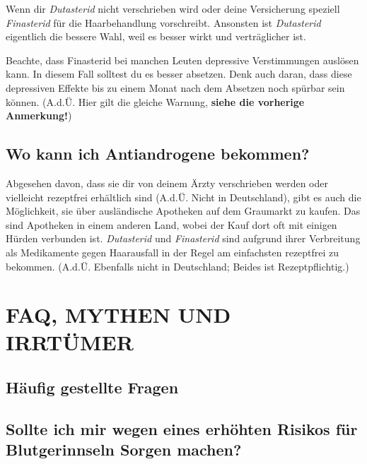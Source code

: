 \documentclass{article}
\begin{document}
Wenn dir \textit{Dutasterid} nicht verschrieben wird oder deine Versicherung speziell \textit{Finasterid} für die Haarbehandlung vorschreibt. Ansonsten ist \textit{Dutasterid} eigentlich die bessere Wahl, weil es besser wirkt und verträglicher ist.

Beachte, dass Finasterid bei manchen Leuten depressive Verstimmungen auslösen kann. In diesem Fall solltest du es besser absetzen. Denk auch daran, dass diese depressiven Effekte bis zu einem Monat nach dem Absetzen noch spürbar sein können. (A.d.Ü. Hier gilt die gleiche Warnung, \textbf{siehe die vorherige Anmerkung!})



\subsection{Wo kann ich Antiandrogene bekommen?}

Abgesehen davon, dass sie dir von deinem Ärzty verschrieben werden oder vielleicht rezeptfrei erhältlich sind (A.d.Ü. Nicht in Deutschland), gibt es auch die Möglichkeit, sie über ausländische Apotheken auf dem Graumarkt zu kaufen. Das sind Apotheken in einem anderen Land, wobei der Kauf dort oft mit einigen Hürden verbunden ist. \textit{Dutasterid} und \textit{Finasterid} sind aufgrund ihrer Verbreitung als Medikamente gegen Haarausfall in der Regel am einfachsten rezeptfrei zu bekommen. (A.d.Ü. Ebenfalls nicht in Deutschland; Beides ist Rezeptpflichtig.)



\section{FAQ, MYTHEN UND IRRTÜMER}\label{MM}

\subsection*{Häufig gestellte Fragen}

\subsection{Sollte ich mir wegen eines erhöhten Risikos für Blutgerinnseln Sorgen machen?}\label{11-1}
\end{document}
